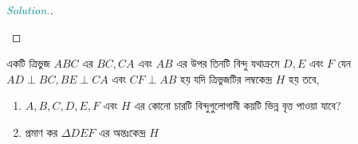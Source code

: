 \documentclass[a4paper,11pt]{article}
\newenvironment{sltn}{\begin{proof}[\emph{\textcolor{darkcyan}{Solution.}}]} {\end{proof}}
\begin{document}
\begin{sltn}
\begin{center}
	\end{center}
\end{sltn}
\begin{xmpl}
	\label{nondirected}
	একটি ত্রিভুজ $ABC$ এর $BC, CA$ এবং $AB$ এর উপর তিনটি বিন্দু যথাক্রমে $D,E$ এবং $F$ যেন $AD \perp BC, BE \perp CA$ এবং $CF \perp AB$ হয় যদি ত্রিভুজটির লম্বকেন্দ্র $H$ হয় তবে, 
	\begin{enumerate}[label=(\alph*),nosep]
		\item $A,B,C,D,E,F$ এবং $H$ এর কোনো চারটি বিন্দুগুলোগামী কয়টি ভিন্ন বৃত্ত পাওয়া যাবে?
		\item প্রমাণ কর $\Delta DEF$ এর অন্তঃকেন্দ্র $H$
	\end{enumerate}
\end{xmpl}
\end{document}
